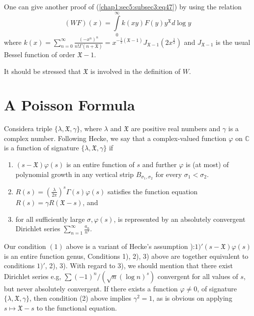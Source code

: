 \begin{remarks*}
  One can give another proof of (\ref{chap1:sec5:subsec3:eq47}) by
  using the relation  
  \begin{equation*}
    (WF)(x)=\int\limits_{0}^{\infty}k(xy)F(y)y^{\mathfrak{X}} d\log y
  \end{equation*}
  where
  $k(x)=\sum\limits_{n=0}^{\infty}\frac{(-x^{n})^{n}}{n!\Gamma
    (n+\mathfrak{X})}
  =x^{-\frac{1}{2}(\mathfrak{X}-1)}J_{\mathfrak{X}-1}(2x^{\frac{1}{2}})$  
  and $J_{\mathfrak{X}-1}$ is the usual Bessel function of order
  $\mathfrak{X}-1$. 

 It should be stressed that $\mathfrak{X}$ is involved in the
 definition of $W$. 
\end{remarks*}

\section{A Poisson Formula} %

 Consider\pageoriginale a triple $\{\lambda, \mathfrak{X},\gamma\}$, where $\lambda$
 and $\mathfrak{X}$ are positive real numbers and $\gamma$ is a complex
 number. Following Hecke, we say that a complex-valued function
 $\varphi$ on $\mathbb{C}$ is a function of signature $\{\lambda,
 \mathfrak{X}, \gamma\}$ if 
\begin{enumerate}
\renewcommand{\labelenumi}{\theenumi)}
\item $(s-\mathfrak{X})\varphi(s)$ is an entire function of $s$ and
  further $\varphi$ is (at most) of polynomial growth in any vertical
  strip $B_{\sigma_{1},\sigma_{2}}$ for every
  $\sigma_{1}<\sigma_{2}$.
\item $R(s)=(\frac{\lambda}{2\pi})^{s}\Gamma(s) \varphi(s)$
  satisfies the function equation $R(s)=\gamma R(\mathfrak{X}-s)$, and
\item for all sufficiently large $\sigma,\varphi(s)$, is represented
  by an absolutely convergent Dirichlet series
  $\sum\limits_{n=1}^{\infty}\frac{a_{n}}{n^{s}}$. 
\end{enumerate}
 Our condition $(1)$ above is a variant of Hecke's assumption 
 \cite{Hec 1}):$1)'(s-\mathfrak{X})\varphi(s)$ is an entire function genus,
 Conditions 1), 2), 3) above are together equivalent to conditions
 $1)'$, 2), 3). With regard to 3),  we should mention that there
 exist Dirichlet series e.g, $\sum(-1)^{n}/(\sqrt{n}(\log n)^{s})$
 convergent for all values of $s$, but never absolutely convergent. If
 there exists a function $\varphi \neq 0$, of signature $\{\lambda,
 \mathfrak{X}, \gamma\}$, then condition (2) above implies
 $\gamma^{2}=1$, as is obvious on applying $s\mapsto\mathfrak{X}-s$ to
 the functional equation.

